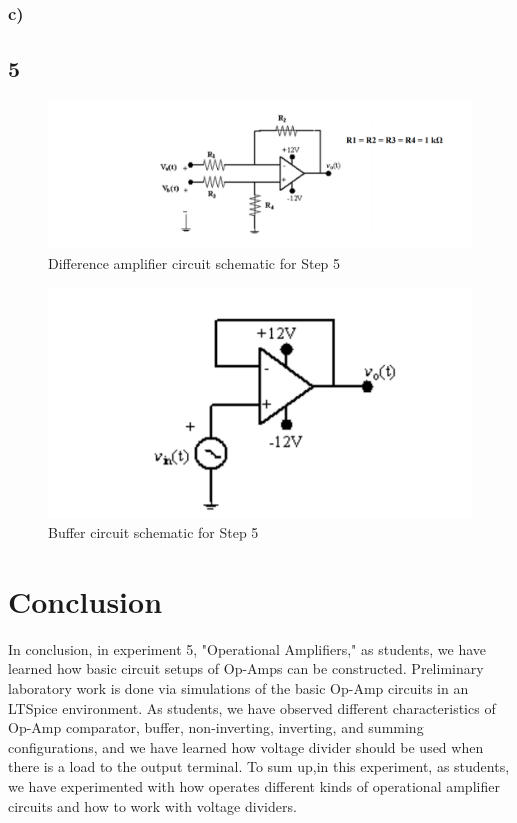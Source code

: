 \documentclass[letterpaper,12pt]{article}
\begin{document}
\subsubsection{c)}

\subsection{5}
\begin{figure}[H]
	\centering
   \includegraphics[width=1\textwidth]{circuit_6.png}
   \caption{Difference amplifier circuit schematic for Step 5}
\end{figure}
\begin{figure}[H]
	\centering
   \includegraphics[width=1\textwidth]{buffer.png}
   \caption{Buffer circuit schematic for Step 5}
\end{figure}

\section{Conclusion}
In conclusion, in experiment 5, "Operational Amplifiers," as students, we have learned how basic circuit setups of Op-Amps can be constructed. Preliminary laboratory work is done via simulations of the basic Op-Amp circuits in an LTSpice environment. As students, we have observed different characteristics of Op-Amp comparator, buffer, non-inverting, inverting, and summing configurations, and we have learned how voltage divider should be used when there is a load to the output terminal. To sum up,in this experiment, as students, we have experimented with how operates different kinds of operational amplifier circuits and how to work with voltage dividers. 
\end{document}

